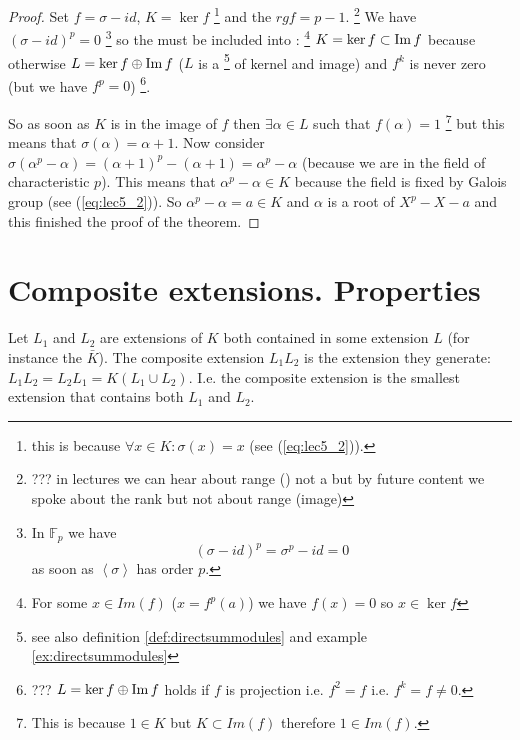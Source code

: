 \begin{theorem}
\begin{proof}
    Set $f = \sigma -id$, $K = \ker f$
    \footnote{
      this is because
      $\forall x \in K: \sigma\left(x\right) = x$ (see
      (\ref{eq:lec5_2})).
    }
    and the  $rg f = p -1$.
    \footnote{
      ??? in lectures we can hear about range () not a
       but by future content we spoke about the rank
      but not about range (image)
    }
    We have 
    $\left(\sigma - id\right)^p = 0$
    \footnote{
      In $\mathbb{F}_p$ we have
      \[
      \left(\sigma - id\right)^p = \sigma^p - id = 0
      \]
      as soon as $\left<\sigma\right>$ has order $p$.      
    }
    so the  must
    be included into :
    \footnote{
      For some $x \in Im\left(f\right)$
      ($x = f^p(a)$)
      we have
      $f(x) = 0$ so $x \in \ker{f}$
    }
    $K = \ker f \subset \operatorname{Im} f$
    because otherwise $L = \ker f \oplus \operatorname{Im} f$ ($L$ is a
    \footnote{
      see also definition \ref{def:directsummodules} and example
      \ref{ex:directsummodules} 
    }
    of 
    kernel and image) and $f^k$ is never zero (but we have $f^p = 0$)
    \footnote{
      ??? $L = \ker f \oplus \operatorname{Im} f$ holds if $f$ is projection i.e.
      $f^2 = f$ i.e. $f^k = f \ne 0$.
    }.

    So as soon as $K$ is in the image of $f$ then $\exists \alpha \in L$
    such that $f\left(\alpha\right) = 1$
    \footnote{
      This is because $1 \in K$ but $K \subset Im\left(f\right)$ therefore
      $1 \in Im\left(f\right)$.
    }
    but this means that
    $\sigma\left(\alpha\right) = \alpha + 1$. Now consider
    $\sigma\left(\alpha^p - \alpha\right) =
    \left(\alpha + 1\right)^p - \left(\alpha + 1\right) = \alpha^p -
    \alpha$ (because we are in the field of characteristic $p$). This
    means that $\alpha^p - \alpha \in K$ because the field is fixed by
    Galois group (see (\ref{eq:lec5_2})). So
    $\alpha^p - \alpha =  a \in K$ and $\alpha$ is a root of $X^p - X
    - a$ and this finished the proof of the theorem.
  \end{proof}
  \label{thm:lec7_1}
\end{theorem}

\section{Composite extensions. Properties}

\begin{definition}
  Let $L_1$ and $L_2$ are extensions of $K$ both contained in some
  extension $L$ (for instance the 
  $\bar{K}$). The composite extension $L_1 L_2$ is the extension they
  generate: $L_1 L_2 = L_2 L_1 = K\left(L_1 \cup L_2\right)$. I.e. the
  composite extension is the smallest extension that contains both
  $L_1$ and $L_2$.
  \label{def:compositeextension}
\end{definition}

